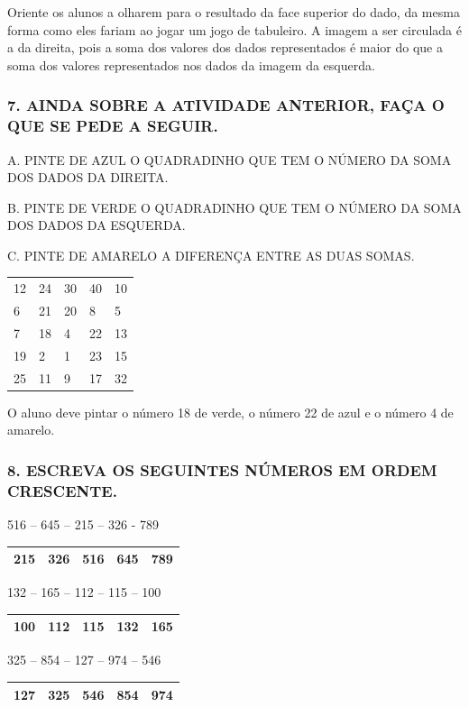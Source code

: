 Oriente os alunos a olharem para o resultado da face
superior do dado, da mesma forma como eles fariam ao jogar um jogo
de tabuleiro. A imagem a ser circulada é a da direita,
pois a soma dos valores dos dados representados é maior do que a soma dos valores representados nos dados da imagem da esquerda.

\subsubsection{7. AINDA SOBRE A ATIVIDADE ANTERIOR, FAÇA O QUE SE PEDE A SEGUIR.}\label{aproveitando-a-atividade-anterior}

A. PINTE DE AZUL O QUADRADINHO QUE TEM O NÚMERO DA SOMA DOS DADOS DA
DIREITA.

B. PINTE DE VERDE O QUADRADINHO QUE TEM O NÚMERO DA SOMA DOS DADOS DA
ESQUERDA.

C. PINTE DE AMARELO A DIFERENÇA ENTRE AS DUAS SOMAS.

\begin{longtable}[]{@{}lllll@{}}
\toprule
12 & 24 & 30 & 40 & 10\tabularnewline
6 & 21 & 20 & 8 & 5\tabularnewline
7 & 18 & 4 & 22 & 13\tabularnewline
19 & 2 & 1 & 23 & 15\tabularnewline
25 & 11 & 9 & 17 & 32\tabularnewline
\bottomrule
\end{longtable}

O aluno deve pintar o número 18 de verde, o número 22 de azul e o número
4 de amarelo.

\subsubsection{8. ESCREVA OS SEGUINTES NÚMEROS EM ORDEM
CRESCENTE.}\label{escreva-os-seguintes-nuxfameros-em-ordem-crescente}
516 -- 645 -- 215 -- 326 - 789

\begin{longtable}[]{@{}lllll@{}}
\toprule
215 & 326 & 516 & 645 & 789\tabularnewline
\bottomrule
\end{longtable}

132 -- 165 -- 112 -- 115 -- 100

\begin{longtable}[]{@{}lllll@{}}
\toprule
100 & 112 & 115 & 132 & 165\tabularnewline
\bottomrule
\end{longtable}

325 -- 854 -- 127 -- 974 -- 546

\begin{longtable}[]{@{}lllll@{}}
\toprule
127 & 325 & 546 & 854 & 974\tabularnewline
\bottomrule
\end{longtable}

